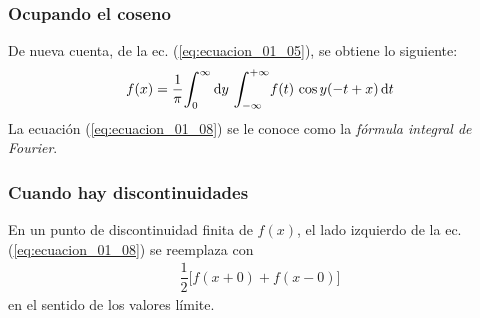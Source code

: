\documentclass[12pt]{beamer}
\begin{document}
\begin{frame}
\frametitle{Ocupando el coseno}
De nueva cuenta, de la ec. (\ref{eq:ecuacion_01_05}), se obtiene lo siguiente:
\pause
\begin{align}
f (x) = \dfrac{1}{\pi} \scaleint{6ex}_{\bs 0}^{\infty}  \dd{y} \, \scaleint{6ex}_{\bs -\infty}^{+\infty} f (t) \, \cos y (-t + x) \dd{t} \label{eq:ecuacion_01_08}
\end{align}
\pause
La ecuación (\ref{eq:ecuacion_01_08}) se le conoce como la \emph{fórmula integral de Fourier}.
\end{frame}
\begin{frame}
\frametitle{Cuando hay discontinuidades}
En un punto de discontinuidad finita de $f (x)$, el lado izquierdo de la ec. (\ref{eq:ecuacion_01_08}) se reemplaza con
\begin{align*}
\dfrac{1}{2} \big[ f (x + 0) + f (x - 0) \big]
\end{align*}
en el sentido de los valores límite.
\end{frame}
\end{document}

